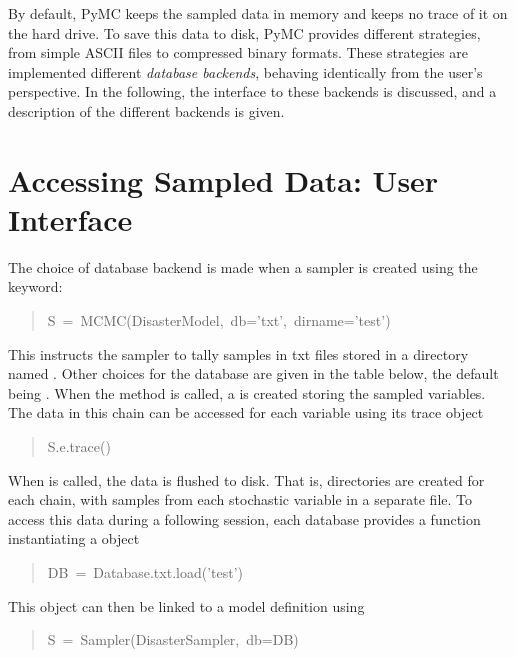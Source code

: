 

By default, PyMC keeps the sampled data in memory and keeps no trace of it on the hard drive. To save this data to disk, PyMC provides different strategies, from simple ASCII files to compressed binary formats. These strategies are implemented different \emph{database backends}, behaving identically from the user's perspective. In the following, the interface to these backends is discussed, and a description of the different backends is given.



\hypertarget{accessing-sampled-data-user-interface}{}
\section*{Accessing Sampled Data: User Interface}
\label{accessing-sampled-data-user-interface}

The choice of database backend is made when a sampler is created using the  keyword:
\begin{quote}{\ttfamily \raggedright \noindent
S~=~MCMC(DisasterModel,~db='txt',~dirname='test')
}\end{quote}

This instructs the sampler to tally samples in txt files stored in a directory named . Other choices for the database are given in the table below, the default being . When the  method is called, a  is created storing the sampled variables. The data in this chain can be accessed for each variable using its trace object
\begin{quote}{\ttfamily \raggedright \noindent
S.e.trace()
}\end{quote}

When  is called, the data is flushed to disk. That is, directories are created for each chain, with samples from each stochastic variable in a separate file. To access this data during a following session, each database provides a  function instantiating a  object
\begin{quote}{\ttfamily \raggedright \noindent
DB~=~Database.txt.load('test')
}\end{quote}

This object can then be linked to a model definition using
\begin{quote}{\ttfamily \raggedright \noindent
S~=~Sampler(DisasterSampler,~db=DB)
}\end{quote}

